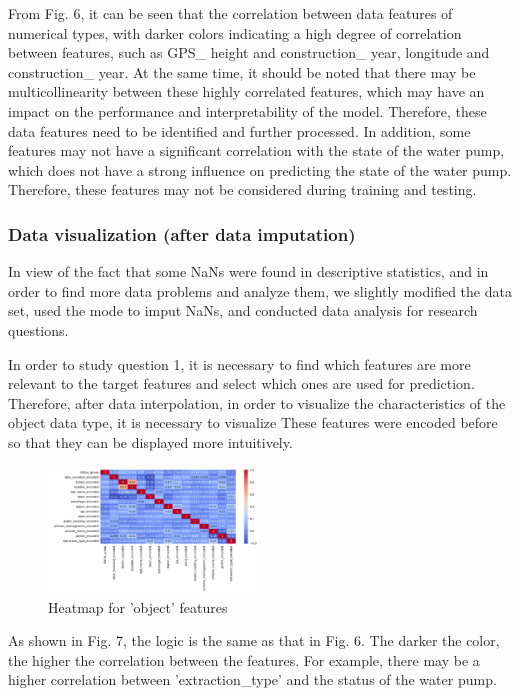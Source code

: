 \documentclass[conference]{IEEEtran}
\begin{document}
From Fig. 6, it can be seen that the correlation between data features of numerical types, with darker colors indicating a high degree of correlation between features, such as GPS\_ height and construction\_ year, longitude and construction\_ year. At the same time, it should be noted that there may be multicollinearity between these highly correlated features, which may have an impact on the performance and interpretability of the model. Therefore, these data features need to be identified and further processed. In addition, some features may not have a significant correlation with the state of the water pump, which does not have a strong influence on predicting the state of the water pump. Therefore, these features may not be considered during training and testing.

\subsubsection{Data visualization (after data imputation)}

In view of the fact that some NaNs were found in descriptive statistics, and in order to find more data problems and analyze them, we slightly modified the data set, used the mode to imput NaNs, and conducted data analysis for research questions.

In order to study question 1, it is necessary to find which features are more relevant to the target features and select which ones are used for prediction. Therefore, after data interpolation, in order to visualize the characteristics of the object data type, it is necessary to visualize These features were encoded before so that they can be displayed more intuitively.

\begin{figure}[H]
\centerline{\includegraphics[width=0.5\textwidth]{6.pic.jpg}}
\caption{Heatmap for 'object' features}
\end{figure}
    
As shown in Fig. 7, the logic is the same as that in Fig. 6. The darker the color, the higher the correlation between the features. For example, there may be a higher correlation between 'extraction\_type' and the status of the water pump.
\end{document}
